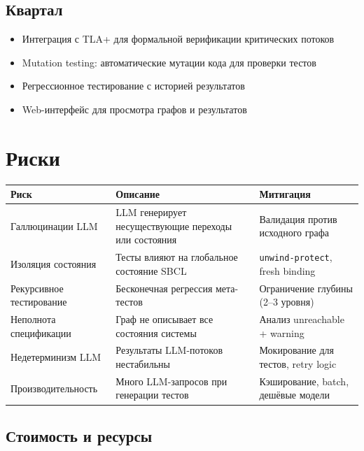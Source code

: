 \documentclass[12pt, a4paper, twoside]{article}
\begin{document}
\subsection{Квартал}

\begin{itemize}[leftmargin=1.5em]
  \item Интеграция с TLA+ для формальной верификации критических потоков
  \item Mutation testing: автоматические мутации кода для проверки тестов
  \item Регрессионное тестирование с историей результатов
  \item Web-интерфейс для просмотра графов и результатов
\end{itemize}

\section{Риски}

\begin{center}
\begin{tabularx}{\textwidth}{lLl}
  \toprule
  \textbf{Риск} & \textbf{Описание} & \textbf{Митигация} \\
  \midrule
  Галлюцинации LLM
    & LLM генерирует несуществующие переходы или состояния
    & Валидация против исходного графа \\
  Изоляция состояния
    & Тесты влияют на глобальное состояние SBCL
    & \texttt{unwind-protect}, fresh binding \\
  Рекурсивное тестирование
    & Бесконечная регрессия мета-тестов
    & Ограничение глубины (2--3 уровня) \\
  Неполнота спецификации
    & Граф не описывает все состояния системы
    & Анализ unreachable + warning \\
  Недетерминизм LLM
    & Результаты LLM-потоков нестабильны
    & Мокирование для тестов, retry logic \\
  Производительность
    & Много LLM-запросов при генерации тестов
    & Кэширование, batch, дешёвые модели \\
  \bottomrule
\end{tabularx}
\end{center}

\subsection{Стоимость и ресурсы}
\end{document}
